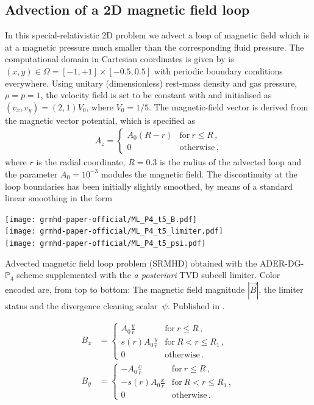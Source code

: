 \subsection{Advection of a 2D magnetic field loop}\label{sec:2d-magnetic-loop}
%
In this special-relativistic 2D problem we advect a loop of magnetic
field which is at a magnetic pressure much smaller than the corresponding
fluid pressure. The computational domain in Cartesian coordinates is
given by is $(x,y)\in \Omega = [-1,+1]\times[-0.5,0.5]$ with periodic
boundary conditions everywhere. Using unitary (dimensionless) rest-mass
density and gas pressure, \ie $\rho=p=1$, the velocity field is set to be
constant with and initialised as $(v_x,v_y)=(2,1)V_0$, where
$V_0=1/5$. The magnetic-field vector is derived from
the magnetic vector potential, which is specified as
%
\begin{align}
  A_z = \left\{ \begin{array}{lr} A_0 (R - r )
    & \text{for} \ r\leq R\,, \\
    0 
    & \text{otherwise}\,,
\end{array}\right.
\end{align}
%
where $r$ is the radial coordinate, $R=0.3$ is the radius of the advected
loop and the parameter $A_0=10^{-3}$ modules the magnetic field. The
discontinuity at the loop boundaries has been initially slightly
smoothed, \eg by means of a standard linear smoothing in the form
%
\begin{marginfigure}[2cm]
	\texttt{[image: grmhd-paper-official/ML\_P4\_t5\_B.pdf]}
	\\
	\texttt{[image: grmhd-paper-official/ML\_P4\_t5\_limiter.pdf]}
	\\
	\texttt{[image: grmhd-paper-official/ML\_P4\_t5\_psi.pdf]} 
	\caption[
	SRMHD Magnetic field loop, $\vec B$ and $\psi$ 
	]{Advected magnetic field loop problem (SRMHD) obtained with the 
		ADER-DG-$\mathbb{P}_4$ scheme supplemented 
		with the \textit{a posteriori}  TVD subcell limiter.
		Color encoded are, from top to bottom:
		The magnetic field magnitude $|\vec B|$, the
		limiter status and the divergence cleaning scalar~$\psi$.
		Published in \cite{Fambri2018}.
	}
	\label{fig:ML_B} %
\end{marginfigure}
%
\begin{align}
  B_x & = \left\{ \begin{array}{cl} A_0 \frac{y}{r}
    & \text{for} \ r\leq R\,, \\s(r) A_0 \frac{y}{r}
    & \text{for} \ R < r\leq R_1\,, \\
    0 
    & \text{otherwise}\,.
\end{array}\right. \\   
B_y& = \left\{ \begin{array}{cl} - A_0 \frac{x}{r}
    & \text{for} \ r\leq R\,, \\ - s(r) A_0 \frac{x}{r}
    & \text{for} \ R < r\leq R_1\,, \\
    0 
    & \text{otherwise}\,.
\end{array}\right.
\end{align}
